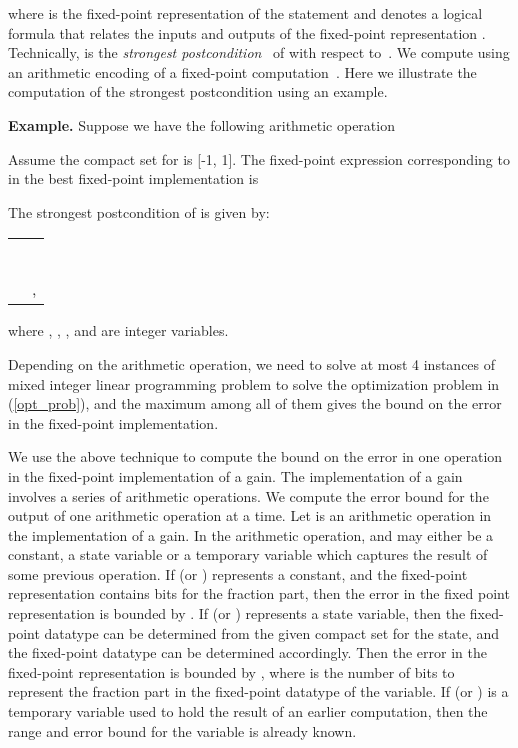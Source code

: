 \documentclass{amsart}
\numberwithin{equation}{section}
\begin{document}
where  is the fixed-point representation of the statement 
and 
 denotes a logical formula that relates the inputs and outputs of the
fixed-point representation . Technically,  is the {\em strongest postcondition}~\cite{Winskel} of  with respect to\ . We compute  
using an arithmetic encoding of a fixed-point computation~\cite{anta}. 
Here we illustrate the computation of the strongest
postcondition  using an example.

\smallskip
\noindent
{\bf Example.} Suppose we have the following arithmetic operation 
 
Assume the compact set for  is [-1, 1]. The fixed-point expression corresponding to  in the best fixed-point implementation is 

The strongest postcondition  of  is given by:\\
\begin{center}
\begin{tabular}{rl}
 &  \\
&  \\
&  \\
&  \\ 
&  \\ 
&  \\ 
& ,
\end{tabular}
\end{center}
where , , , and  are integer variables.

Depending on the arithmetic operation, we need to solve at most 4 instances of mixed integer linear
programming problem to solve the optimization problem in (\ref{opt_prob}), and the maximum among all of them gives the bound on the error in the
fixed-point implementation.

We use the above technique to compute the bound on the error in one operation in the 
fixed-point implementation of a gain. The implementation of a gain
involves a series of arithmetic operations. We compute the error bound for the output of one arithmetic operation
at a time. Let  is an arithmetic operation in the implementation of a gain. In the arithmetic operation,
 and  may either be a constant, a state variable or a temporary variable which captures the result of some
previous operation. If  (or ) represents a constant, and the fixed-point representation contains  bits for the 
fraction part, then the error in the fixed point representation is bounded by . If  (or ) represents
a state variable, then the fixed-point datatype can be determined from the given compact set for the state, and the fixed-point
datatype can be determined accordingly. Then the error in the fixed-point representation is bounded by , where
 is the number of bits to represent the fraction part in the fixed-point datatype of the variable. If   (or ) is a temporary variable used to hold 
the result of an earlier computation, then the range and error bound for the variable is already known.
\end{document}
